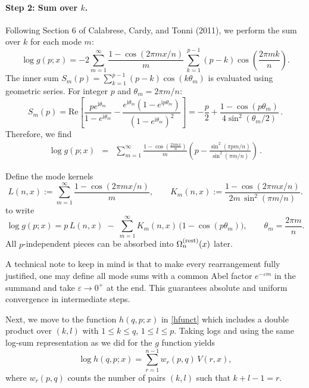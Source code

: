 \documentclass[11pt]{article}
\newcommand{\ii}{\mathrm{i}}
\newcommand{\eps}{\varepsilon}
\newcommand{\lb}{\left(}
\newcommand{\rb}{\right)}
\begin{document}
\paragraph{Step 2: Sum over $k$.}
Following Section 6 of Calabrese, Cardy, and Tonni (2011), we perform the sum over $k$ for each mode $m$:
\begin{equation}
\log g(p;x) = -2 \sum_{m=1}^{\infty} \frac{1 - \cos(2\pi m x/n)}{m}\, \sum_{k=1}^{p-1} (p-k) \cos\left(\frac{2\pi m k}{n}\right).
\end{equation}
The inner sum $S_m(p) = \sum_{k=1}^{p-1} (p-k) \cos(k\theta_m)$ is evaluated using geometric series. For integer $p$ and $\theta_m=2\pi m/n$:
\begin{equation}
S_m(p) =
\mathrm{Re} \left[
\frac{p e^{\ii\theta_m}}{1-e^{\ii\theta_m}} -
\frac{e^{\ii\theta_m}(1-e^{\ii p\theta_m})}{(1-e^{\ii\theta_m})^2}
\right]
=
-\frac{p}{2}+\frac{1-\cos(p\theta_m)}{4\sin^2(\theta_m/2)}\,.
\end{equation}
Therefore, we find
\begin{eqnarray}
\log g(p;x)
&=&
\sum_{m=1}^\infty \frac{1-\cos(\frac{2\pi m x}{n})}{m}
\lb p-\frac{\sin^2(\pi p m/n)}{\sin^2(\pi m/n)}\rb\,.
\end{eqnarray}

Define the mode kernels
\begin{equation}
L(n,x):=\sum_{m=1}^\infty \frac{1-\cos(2\pi m x/n)}{m},
\qquad
K_m(n,x):=\frac{1-\cos(2\pi m x/n)}{2m\,\sin^2(\pi m/n)}.
\label{eq:L-Km}
\end{equation}
to write
\begin{equation}
\log g(p;x)= p\,L(n,x)\;-\;\sum_{m=1}^\infty K_m(n,x)\,\bigl(1-\cos(p\theta_m)\bigr),
\qquad \theta_m=\frac{2\pi m}{n}.
\label{eq:logg-final}
\end{equation}
All $p$-independent pieces can be absorbed into $\Omega_{n}^{\rm (rest)}(x)$ later.

A technical note to keep in mind is that to make every rearrangement fully justified, one may define all mode sums with a common Abel factor
$e^{-\eps m}$ in the summand and take $\eps\to 0^+$ at the end. This guarantees absolute and uniform convergence in intermediate steps.

Next, we move to the function $h(q,p;x)$ in \eqref{hfunct} which includes a double product over $(k,l)$ with $1\le k\le q$, $1\le l\le p$.
Taking logs and using the same log-sum representation as we did for the $g$ function yields
\begin{equation}
\log h(q,p;x)=\sum_{r=1}^{n-1} w_r(p,q)\,V(r,x),
\label{eq:logh-weighted}
\end{equation}
where $w_r(p,q)$ counts the number of pairs $(k,l)$ such that $k+l-1=r$.
\end{document}
